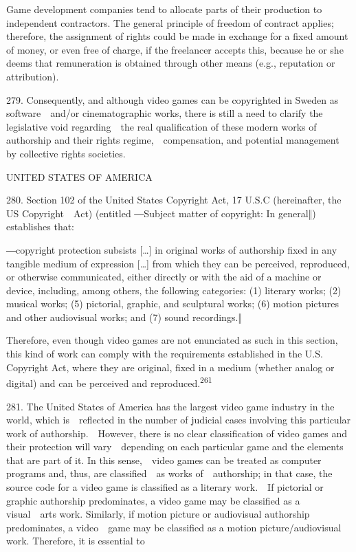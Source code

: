 \documentclass[
]{article}
\begin{document}
{Game development companies tend to allocate parts of their production
to independent contractors. The general principle of freedom of contract
applies; therefore, the assignment of rights could be made in exchange
for a fixed amount of money, or even free of charge, if the freelancer
accepts this, because he or she deems that remuneration is obtained
through other means (e.g., reputation or attribution).}

{279. }{Consequently, and although video games can be copyrighted in
Sweden as software~~and/or cinematographic works, there is still a need
to clarify the legislative void regarding~~the real qualification of
these modern works of authorship and their rights regime,~~compensation,
and potential management by collective rights societies.}

{UNITED STATES OF AMERICA}

{280. }{Section 102 of the United States }{Copyright Act, 17 U.S.C
}{(hereinafter, the US }{Copyright~~Act}{) (entitled ―}{Subject matter
of copyright: In general}{‖) establishes that:}

{―}{copyright protection subsists }{{[}\ldots{]} }{in original works of
authorship fixed in any tangible medium of expression }{{[}\ldots{]}
}{from which they can be perceived, reproduced, or otherwise
communicated, either directly or with the aid of a machine or device}{,
including, among others, the following categories: }{(1) literary works;
(2) musical works; (5) pictorial, graphic, and sculptural works; (6)
motion pictures and other audiovisual works; }{and }{(7) sound
}{recordings.‖}

{Therefore, even though video games are not enunciated as such in this
section, this kind of work can comply with the requirements established
in the U.S. }{Copyright Act}{, where they are original, fixed in a
medium (whether analog or digital) and can be perceived and
reproduced.}\textsuperscript{{261}}

{281. }{The United States of America has the largest video game industry
in the world, which is~~reflected in the number of judicial cases
involving this particular work of authorship.~~However, there is no
clear classification of video games and their protection will
vary~~depending on each particular game and the elements that are part
of it. In this sense,~~video games can be treated as computer programs
and, thus, are classified~~as works of~~authorship; in that case, the
source code for a video game is classified as a literary work.~~If
pictorial or graphic authorship predominates, a video game may be
classified as a visual~~arts work. Similarly, if motion picture or
audiovisual authorship predominates, a video~~game may be classified as
a motion picture/audiovisual work. Therefore, it is essential to}
\end{document}
